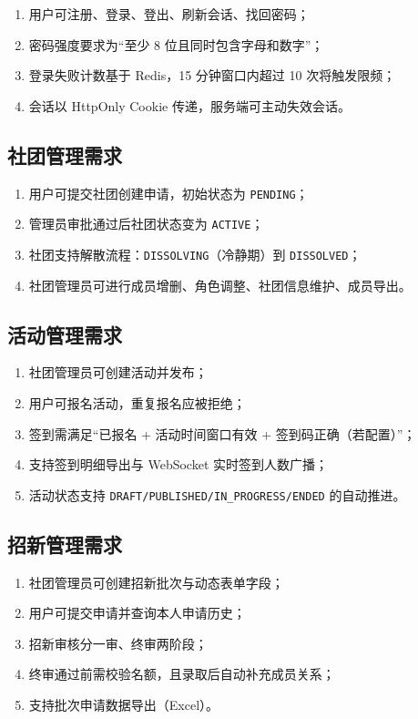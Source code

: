 \begin{enumerate}
  \item 用户可注册、登录、登出、刷新会话、找回密码；
  \item 密码强度要求为“至少 8 位且同时包含字母和数字”；
  \item 登录失败计数基于 Redis，15 分钟窗口内超过 10 次将触发限频；
  \item 会话以 HttpOnly Cookie 传递，服务端可主动失效会话。
\end{enumerate}

\subsection{社团管理需求}

\begin{enumerate}
  \item 用户可提交社团创建申请，初始状态为 \texttt{PENDING}；
  \item 管理员审批通过后社团状态变为 \texttt{ACTIVE}；
  \item 社团支持解散流程：\texttt{DISSOLVING}（冷静期）到 \texttt{DISSOLVED}；
  \item 社团管理员可进行成员增删、角色调整、社团信息维护、成员导出。
\end{enumerate}

\subsection{活动管理需求}

\begin{enumerate}
  \item 社团管理员可创建活动并发布；
  \item 用户可报名活动，重复报名应被拒绝；
  \item 签到需满足“已报名 + 活动时间窗口有效 + 签到码正确（若配置）”；
  \item 支持签到明细导出与 WebSocket 实时签到人数广播；
  \item 活动状态支持 \texttt{DRAFT/PUBLISHED/IN\_PROGRESS/ENDED} 的自动推进。
\end{enumerate}

\subsection{招新管理需求}

\begin{enumerate}
  \item 社团管理员可创建招新批次与动态表单字段；
  \item 用户可提交申请并查询本人申请历史；
  \item 招新审核分一审、终审两阶段；
  \item 终审通过前需校验名额，且录取后自动补充成员关系；
  \item 支持批次申请数据导出（Excel）。
\end{enumerate}

